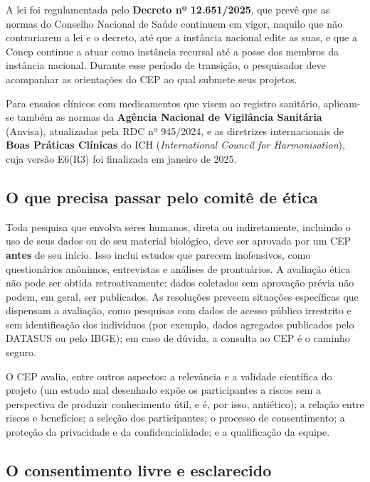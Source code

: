 \documentclass[
]{book}
\begin{document}
A lei foi regulamentada pelo \textbf{Decreto nº 12.651/2025}, que prevê que as normas do Conselho Nacional de Saúde continuem em vigor, naquilo que não contrariarem a lei e o decreto, até que a instância nacional edite as suas, e que a Conep continue a atuar como instância recursal até a posse dos membros da instância nacional. Durante esse período de transição, o pesquisador deve acompanhar as orientações do CEP ao qual submete seus projetos.

Para ensaios clínicos com medicamentos que visem ao registro sanitário, aplicam-se também as normas da \textbf{Agência Nacional de Vigilância Sanitária} (Anvisa), atualizadas pela RDC nº 945/2024, e as diretrizes internacionais de \textbf{Boas Práticas Clínicas} do ICH (\emph{International Council for Harmonisation}), cuja versão E6(R3) foi finalizada em janeiro de 2025.

\subsection{O que precisa passar pelo comitê de ética}\label{o-que-precisa-passar-pelo-comituxea-de-uxe9tica}

Toda pesquisa que envolva seres humanos, direta ou indiretamente, incluindo o uso de seus dados ou de seu material biológico, deve ser aprovada por um CEP \textbf{antes} de seu início. Isso inclui estudos que parecem inofensivos, como questionários anônimos, entrevistas e análises de prontuários. A avaliação ética não pode ser obtida retroativamente: dados coletados sem aprovação prévia não podem, em geral, ser publicados. As resoluções preveem situações específicas que dispensam a avaliação, como pesquisas com dados de acesso público irrestrito e sem identificação dos indivíduos (por exemplo, dados agregados publicados pelo DATASUS ou pelo IBGE); em caso de dúvida, a consulta ao CEP é o caminho seguro.

O CEP avalia, entre outros aspectos: a relevância e a validade científica do projeto (um estudo mal desenhado expõe os participantes a riscos sem a perspectiva de produzir conhecimento útil, e é, por isso, antiético); a relação entre riscos e benefícios; a seleção dos participantes; o processo de consentimento; a proteção da privacidade e da confidencialidade; e a qualificação da equipe.

\subsection{O consentimento livre e esclarecido}\label{o-consentimento-livre-e-esclarecido}
\end{document}
